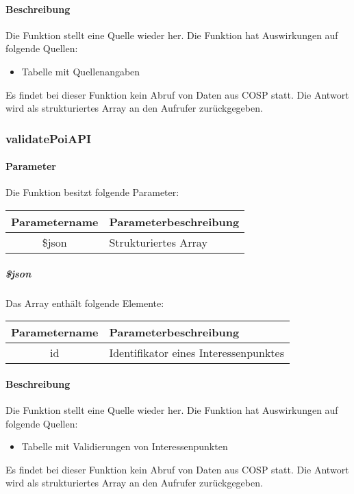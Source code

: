 \paragraph{Beschreibung} Die Funktion stellt eine Quelle wieder her. Die Funktion hat Auswirkungen auf folgende Quellen:
\begin{itemize}
	\item Tabelle mit Quellenangaben
\end{itemize}
Es findet bei dieser Funktion kein Abruf von Daten aus {\glqq COSP\grqq} statt. Die Antwort wird als strukturiertes Array an den Aufrufer zurückgegeben.
\subsubsection{validatePoiAPI}
\paragraph{Parameter} Die Funktion besitzt folgende Parameter:
\begin{table}[H]
	\begin{tabular}{|c|p{11cm}|}
		\hline
		\textbf{Parametername} & \textbf{Parameterbeschreibung} \\ \hline
		\$json & Strukturiertes Array \\ \hline
	\end{tabular}
\end{table}
\subparagraph{\$json}Das Array enthält folgende Elemente:
\begin{table}[H]
	\begin{tabular}{|c|p{11cm}|}
		\hline
		\textbf{Parametername} & \textbf{Parameterbeschreibung} \\ \hline
		id & Identifikator eines Interessenpunktes \\ \hline
	\end{tabular}
\end{table}
\paragraph{Beschreibung} Die Funktion stellt eine Quelle wieder her. Die Funktion hat Auswirkungen auf folgende Quellen:
\begin{itemize}
	\item Tabelle mit Validierungen von Interessenpunkten
\end{itemize}
Es findet bei dieser Funktion kein Abruf von Daten aus {\glqq COSP\grqq} statt. Die Antwort wird als strukturiertes Array an den Aufrufer zurückgegeben.
